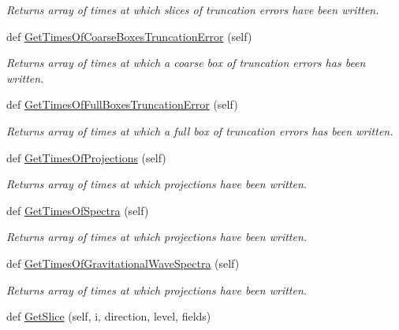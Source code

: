 \begin{DoxyCompactItemize}
\begin{DoxyCompactList}\small\item\em Returns array of times at which slices of truncation errors have been written. \end{DoxyCompactList}\item 
def \mbox{\hyperlink{classpySledgehamr_1_1Output_1_1Output_a386f9d9a8353e04ea2dfc34a90335028}{Get\+Times\+Of\+Coarse\+Boxes\+Truncation\+Error}} (self)
\begin{DoxyCompactList}\small\item\em Returns array of times at which a coarse box of truncation errors has been written. \end{DoxyCompactList}\item 
def \mbox{\hyperlink{classpySledgehamr_1_1Output_1_1Output_af7b124c1c4ff4d9e81b68f5b35202ec6}{Get\+Times\+Of\+Full\+Boxes\+Truncation\+Error}} (self)
\begin{DoxyCompactList}\small\item\em Returns array of times at which a full box of truncation errors has been written. \end{DoxyCompactList}\item 
def \mbox{\hyperlink{classpySledgehamr_1_1Output_1_1Output_a6b3834816bb3f6000e1ee3db22fd297a}{Get\+Times\+Of\+Projections}} (self)
\begin{DoxyCompactList}\small\item\em Returns array of times at which projections have been written. \end{DoxyCompactList}\item 
def \mbox{\hyperlink{classpySledgehamr_1_1Output_1_1Output_a537193eb3016273e943b4542924a0c07}{Get\+Times\+Of\+Spectra}} (self)
\begin{DoxyCompactList}\small\item\em Returns array of times at which projections have been written. \end{DoxyCompactList}\item 
def \mbox{\hyperlink{classpySledgehamr_1_1Output_1_1Output_a7342e1e19956475ca5ed382335946b14}{Get\+Times\+Of\+Gravitational\+Wave\+Spectra}} (self)
\begin{DoxyCompactList}\small\item\em Returns array of times at which projections have been written. \end{DoxyCompactList}\item 
def \mbox{\hyperlink{classpySledgehamr_1_1Output_1_1Output_afebc7666679daba6da2dc46511518b15}{Get\+Slice}} (self, i, direction, level, fields)

\end{DoxyCompactItemize}
